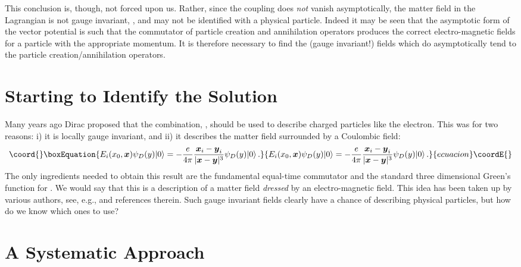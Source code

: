 \documentclass[12pt,a4paper]{article}
\providecommand{\ket}[1]{\vert #1 \rangle}
\providecommand{\psidirac}{\psi_D}
\begin{document}
This conclusion is, though, not forced upon us. Rather, since the coupling does \textit{not}
vanish asymptotically, the matter field in the Lagrangian is not gauge invariant, \coordHE{},
and may not be identified with a physical particle. Indeed it may be seen that the asymptotic form of the
vector potential is such that the commutator of particle creation and annihilation operators produces the
correct electro-magnetic fields for a particle with the appropriate momentum. It is therefore necessary to find the
(gauge invariant!) fields which do asymptotically tend to the particle creation/annihilation operators.


\section*{Starting to Identify the Solution}

Many years ago Dirac\cite{Dirac:1955ca} proposed
that the combination, \coordHE{},
should be used to describe charged particles like the electron. This was for two reasons: i) it is locally
gauge invariant, and ii) it describes the matter field surrounded by a Coulombic field:
\begin{equation}\coord{}\boxEquation{
E_i(x_0,{\boldsymbol{x}})\psidirac(y)\ket0=
-\frac {e}{4\pi}
\frac{{\boldsymbol{x}_i-\boldsymbol{y}_i}}{\vert{\boldsymbol{x}-
\boldsymbol{y}}\vert^3}\psidirac(y)\ket0\,.
}{
E_i(x_0,{\boldsymbol{x}})\psidirac(y)\ket0=
-\frac {e}{4\pi}
\frac{{\boldsymbol{x}_i-\boldsymbol{y}_i}}{\vert{\boldsymbol{x}-
\boldsymbol{y}}\vert^3}\psidirac(y)\ket0\,.
}{ecuacion}\coordE{}\end{equation}
The only ingredients needed to obtain this result are the fundamental equal-time commutator and the standard
three dimensional Green's function for \coordHE{}. We would say that this is a description of a matter field
\textit{dressed} by an electro-magnetic field. This idea has been taken up by various authors, see, e.g.,
\cite{Lavelle:1997ty,Horan:1998im,haller:1996} and references therein.
Such gauge invariant fields clearly have a chance of describing physical particles, but how do we
know which ones to use?

\section*{A Systematic Approach}
\end{document}
